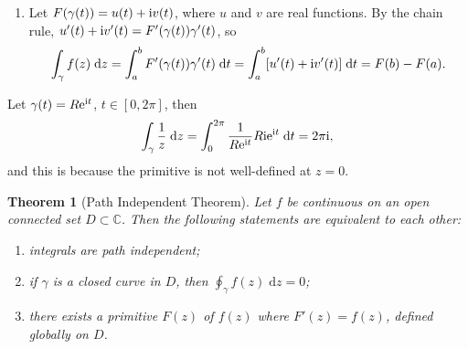 \documentclass[letter-paper]{tufte-book}
\newtheorem{theorem}{\color{pastel-blue}Theorem}[section]
\newenvironment{proof}[1][Proof]{\begin{trivlist}
\item[\hskip \labelsep {\bfseries #1}]}{\end{trivlist}}
\newenvironment{example}[1][Example]{\begin{trivlist}
\item[\hskip \labelsep {\bfseries #1}]}{\end{trivlist}}
\newcommand{\ex}{\mathrm{e}}
\newcommand{\zi}{{\rm i}}
\begin{document}
\begin{proof}
\begin{enumerate}
    \item Let $F(\gamma(t)) = u(t) + \zi v(t)$, where $u$ and $v$ are real
    functions. By the chain rule, $u'(t) + \zi v'(t) = F'(\gamma(t))\gamma'(t)$,
    so
    \begin{align*}
      \int_\gamma f(z)\; \mathrm{d}z = \int^b_a F'(\gamma(t))\gamma'(t)\; \mathrm{d}t = \int^b_a [u'(t) + \zi v'(t)]\; \mathrm{d}t = F(b) - F(a).
    \end{align*}
  \end{enumerate}
\end{proof}

\begin{example}
  Let $\gamma(t) = R\ex^{\zi t}$, $t\in[0, 2\pi]$, then
  \begin{equation*}
    \int_\gamma \frac{1}{z}\; \mathrm{d}z = \int^{2\pi}_0 \frac{1}{R\ex^{\zi t}} R\zi \ex^{\zi t}\; \mathrm{d}t = 2\pi \zi,
  \end{equation*}
  and this is because the primitive is not well-defined at $z=0$.
\end{example}

\begin{theorem}[Path Independent Theorem]
  Let $f$ be continuous on an open connected set $D \subset \mathbb{C}$. Then
  the following statements are equivalent to each other:
  \begin{enumerate}
    \item integrals are path independent;
    \item if $\gamma$ is a closed curve in $D$, then $\oint_\gamma f(z)\; \mathrm{d}z = 0$;
    \item there exists a primitive $F(z)$ of $f(z)$ where $F'(z) = f(z)$,
    defined globally on $D$.
  \end{enumerate}
\end{theorem}
\end{document}
